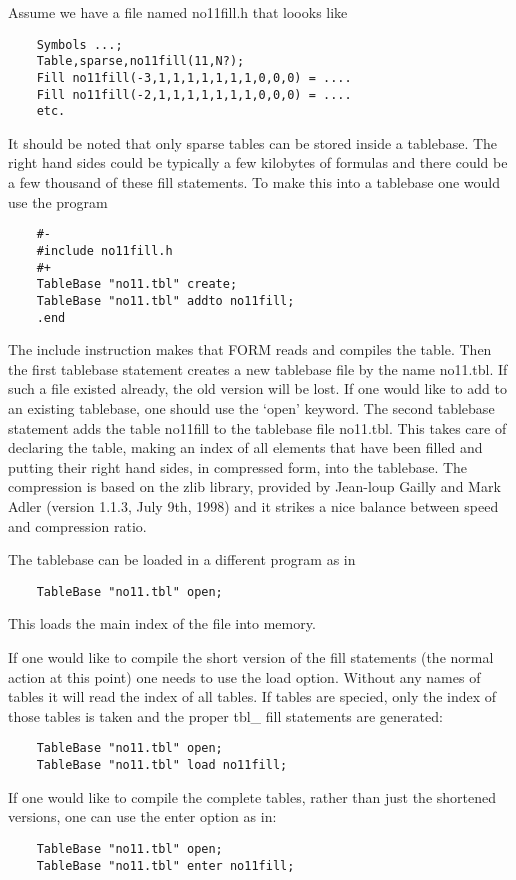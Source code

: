 Assume we have a file named no11fill.h that loooks like
\begin{verbatim}
    Symbols ...;
    Table,sparse,no11fill(11,N?);
    Fill no11fill(-3,1,1,1,1,1,1,1,0,0,0) = ....
    Fill no11fill(-2,1,1,1,1,1,1,1,0,0,0) = ....
    etc.
\end{verbatim}
It should be noted that only sparse tables can be stored 
inside a tablebase. The right hand sides could be typically a few kilobytes 
of formulas and there could be a few thousand of these fill statements. To 
make this into a tablebase one would use the program
\begin{verbatim}
    #-
    #include no11fill.h
    #+
    TableBase "no11.tbl" create;
    TableBase "no11.tbl" addto no11fill;
    .end
\end{verbatim}
The include instruction makes that FORM reads and compiles 
the table. Then the first tablebase statement creates a new tablebase file 
by the name no11.tbl. If such a file existed already, the old version will 
be lost. If one would like to add to an existing tablebase, one should use 
the `open' keyword. The second tablebase statement adds the 
table no11fill to the tablebase file no11.tbl. This takes care of declaring 
the table, making an index of all elements that have been filled and 
putting their right hand sides, in compressed form, into the tablebase. The 
compression is based on the zlib library, provided by Jean-loup 
Gailly and Mark Adler (version 
1.1.3, July 9th, 1998) and it strikes a nice balance between speed and 
compression ratio.

The tablebase can be loaded in a different program as in
\begin{verbatim}
    TableBase "no11.tbl" open;
\end{verbatim}
This loads the main index of the file into memory.

If one would like to compile the short version of the fill statements (the 
normal action at this point) one needs to use the load option. 
Without any names of tables it will read the index of all tables. If tables 
are specied, only the index of those tables is taken and the proper 
tbl\_ fill statements are generated:
\begin{verbatim}
    TableBase "no11.tbl" open;
    TableBase "no11.tbl" load no11fill;
\end{verbatim}

If one would like to compile the complete tables, rather 
than just the shortened versions, one can use the enter option as in:
\begin{verbatim}
    TableBase "no11.tbl" open;
    TableBase "no11.tbl" enter no11fill;
\end{verbatim}


